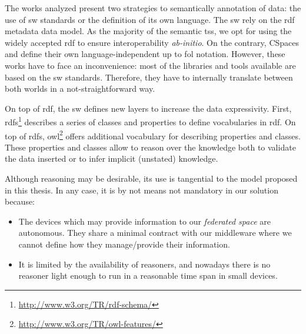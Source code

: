 The works analyzed present two strategies to semantically annotation of data: the use of \ac{sw} standards or the definition of its own language.
The \ac{sw} rely on the \ac{rdf} metadata data model. %
As the majority of the semantic \ac{ts}s, we opt for using the widely accepted \ac{rdf} to ensure interoperability \emph{ab-initio}.
On the contrary, CSpaces \citep{martinrecuerda_towards_2005} and \citet{nardini_semantic_2013} define their own language-independent up to \ac{fol} notation.
However, these works have to face an inconvenience: most of the libraries and tools available are based on the \ac{sw} standards. %
Therefore, they have to internally translate between both worlds in a not-straightforward way. %



On top of \ac{rdf}, the \ac{sw} defines new layers to increase the data expressivity.
First, \ac{rdfs}\footnote{\url{http://www.w3.org/TR/rdf-schema/}} describes a series of classes and properties to define vocabularies in \ac{rdf}.
On top of \ac{rdfs}, \ac{owl}\footnote{\url{http://www.w3.org/TR/owl-features/}} offers additional vocabulary for describing properties and classes.
These properties and classes allow to reason over the knowledge both to validate the data inserted or to infer implicit (unstated) knowledge. %


Although reasoning may be desirable, its use is tangential to the model proposed in this thesis.
In any case, it is by not means not mandatory in our solution because:
\begin{itemize}
  \item The devices which may provide information to our \emph{federated space} are autonomous.
	They share a minimal contract with our middleware where we cannot define how they manage/provide their information.
  \item It is limited by the availability of reasoners, and nowadays there is no reasoner light enough to run in a reasonable time span in small devices.
\end{itemize}

